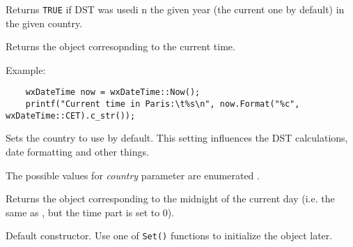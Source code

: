 
Returns {\tt TRUE} if DST was usedi n the given year (the current one by
default) in the given country.

\label{wxdatetimenow}


Returns the object corresopnding to the current time.

Example:

\begin{verbatim}
    wxDateTime now = wxDateTime::Now();
    printf("Current time in Paris:\t%s\n", now.Format("%c", wxDateTime::CET).c_str());
\end{verbatim}



\label{wxdatetimesetcountry}


Sets the country to use by default. This setting influences the DST
calculations, date formatting and other things.

The possible values for {\it country} parameter are enumerated 
.



\label{wxdatetimetoday}


Returns the object corresponding to the midnight of the current day (i.e. the
same as , but the time part is set to $0$).




\label{wxdatetimewxdatetimedef}


Default constructor. Use one of {\tt Set()} functions to initialize the object
later.


